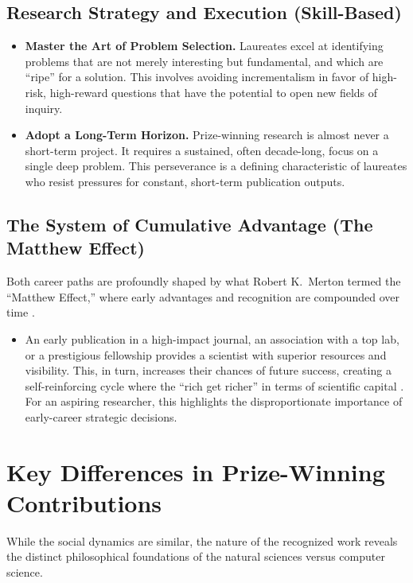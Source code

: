 \subsection{Research Strategy and Execution (Skill-Based)}
\begin{itemize}[leftmargin=*]
    \item \textbf{Master the Art of Problem Selection.} Laureates excel at identifying problems that are not merely interesting but fundamental, and which are ``ripe'' for a solution.
    This involves avoiding incrementalism in favor of high-risk, high-reward questions that have the potential to open new fields of inquiry.

    \item \textbf{Adopt a Long-Term Horizon.} Prize-winning research is almost never a short-term project.
    It requires a sustained, often decade-long, focus on a single deep problem.
    This perseverance is a defining characteristic of laureates who resist pressures for constant, short-term publication outputs.
\end{itemize}

\subsection{The System of Cumulative Advantage (The Matthew Effect)}
Both career paths are profoundly shaped by what Robert K.\ Merton termed the ``Matthew Effect,'' where early advantages and recognition are compounded over time \citep{merton1968}.
\begin{itemize}[leftmargin=*]
    \item An early publication in a high-impact journal, an association with a top lab, or a prestigious fellowship provides a scientist with superior resources and visibility.
    This, in turn, increases their chances of future success, creating a self-reinforcing cycle where the ``rich get richer'' in terms of scientific capital \citep{merton1968}.
    For an aspiring researcher, this highlights the disproportionate importance of early-career strategic decisions.
\end{itemize}

\section{Key Differences in Prize-Winning Contributions}
\label{sec:prize_differences}

While the social dynamics are similar, the nature of the recognized work reveals the distinct philosophical foundations of the natural sciences versus computer science.

